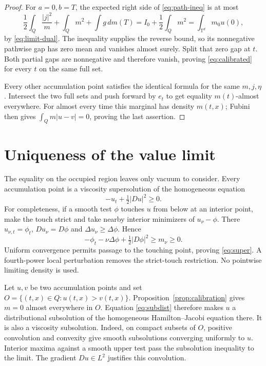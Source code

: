 \documentclass[11pt]{article}
\newcommand{\T}{\mathbb T}
\numberwithin{equation}{section}
\begin{document}
\begin{proof}
For \(a=0,b=T\), the expected right side of \eqref{eq:path-ineq}
is at most
\[
 \frac12\int_Q\frac{|j|^2}{m}+\int_Qm^2+\int g\,dm(T)
 =I_0+\frac12\int_Qm^2
 =\int_{\T^d}m_0u(0),
\]
by \eqref{eq:limit-dual}. The inequality supplies the reverse bound,
so its nonnegative pathwise gap has zero mean and vanishes almost surely.
Split that zero gap at \(t\). Both partial gaps are nonnegative and
therefore vanish, proving \eqref{eq:calibrated} for every \(t\)
on the same full set.

Every other accumulation point satisfies the identical formula for
the same \(m,j,\eta\). Intersect the two full sets and push forward
by \(e_t\) to get equality \(m(t)\)-almost everywhere.
For almost every time this marginal has density \(m(t,x)\);
Fubini then gives \(\int_Q m|u-v|=0\), proving the last assertion.
\end{proof}

\section{Uniqueness of the value limit}\label{sec:vacuum}

The equality on the occupied region leaves only vacuum to consider.
Every accumulation point is a viscosity supersolution of the homogeneous
equation
\begin{equation}\label{eq:super}
 -u_t+\tfrac12|Du|^2\ge0 .
\end{equation}
For completeness, if a smooth test \(\phi\) touches \(u\) from below
at an interior point, make the touch strict and take nearby interior
minimizers of \(u_\nu-\phi\). There
\(u_{\nu,t}=\phi_t\), \(Du_\nu=D\phi\) and
\(\Delta u_\nu\ge\Delta\phi\). Hence
\[
 -\phi_t-\nu\Delta\phi+\tfrac12|D\phi|^2\ge m_\nu\ge0 .
\]
Uniform convergence permits passage to the touching point, proving
\eqref{eq:super}. A fourth-power local perturbation removes the
strict-touch restriction. No pointwise limiting density is used.

Let \(u,v\) be two accumulation points and set
\(O=\{(t,x)\in Q:u(t,x)>v(t,x)\}\).
Proposition~\ref{prop:calibration} gives \(m=0\) almost everywhere in \(O\).
Equation \eqref{eq:subdist} therefore makes \(u\) a distributional
subsolution of the homogeneous Hamilton--Jacobi equation there.
It is also a viscosity subsolution. Indeed, on compact subsets of \(O\),
positive convolution and convexity give smooth subsolutions converging
uniformly to \(u\). Interior maxima against a smooth upper test pass
the subsolution inequality to the limit. The gradient \(Du\in L^2\)
justifies this convolution.
\end{document}
